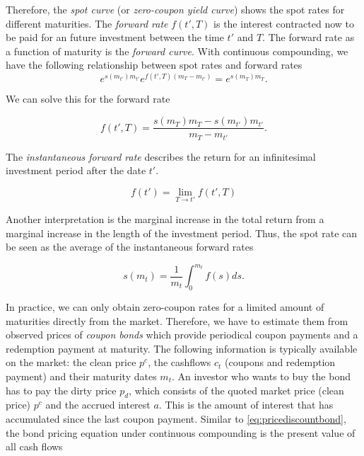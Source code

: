 Therefore, the \emph{spot curve} (or \emph{zero-coupon yield curve}) shows the spot rates for different maturities. The \emph{forward rate} $f(t',T)$ is the interest contracted now to be paid for an future investment between the time $t'$ and $T$. The forward rate as a function of maturity is the \emph{forward curve}. With continuous compounding, we have the following relationship between spot rates and forward rates
\begin{equation*}
  \label{eq:relspotforward}
  e^{s(m_{t'}) m_{t'}}e^{f(t',T)(m_T-m_{t'})} = e^{s(m_T) m_T}.
\end{equation*}

We can solve this for the forward rate

\begin{equation*}
  \label{eq:forwardrate}
  f(t',T) = \frac{s(m_T)m_T - s(m_{t'})m_{t'}}{m_T-m_{t'}}.
\end{equation*}

The \emph{instantaneous forward rate} describes the return for an infinitesimal investment period after the date $t'$.

\begin{equation*}
  \label{eq:instforw}
  f(t') = \lim_{T\rightarrow t'}f(t',T)
\end{equation*}

Another interpretation is the marginal increase in the total return from a marginal increase in the length of the investment period. Thus, the spot rate can be seen as the average of the instantaneous forward rates

\begin{equation}
  \label{eq:avgforwardrate}
  s(m_t)=\frac{1}{m_t}\int_0^{m_t}f(s)ds.
\end{equation}

In practice, we can only obtain zero-coupon rates for a limited amount of maturities directly from the market. Therefore, we have to estimate them from observed prices of \emph{coupon bonds} which provide periodical coupon payments and a redemption payment at maturity. The following information is typically available on the market: the clean price $p^c$, the cashflows $c_t$ (coupons and redemption payment) and their maturity dates $m_t$. An investor who wants to buy the bond has to pay the dirty price $p_d$, which consists of the quoted market price (clean price) $p^c$ and the accrued interest $a$. This is the amount of interest that has accumulated since the last coupon payment. Similar to \eqref{eq:pricediscountbond}, the bond pricing equation under continuous compounding is the present value of all cash flows

